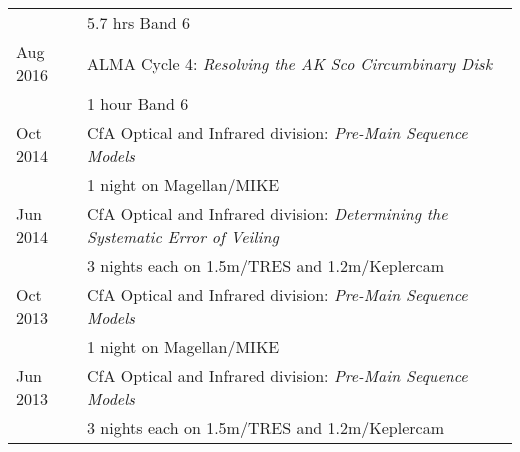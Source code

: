 \begin{tabular*}{\textwidth}{@{\hspace{10pt}}p{1.2in}l}
  & 5.7 hrs Band 6\\
  Aug 2016 & ALMA Cycle 4: \emph{Resolving the AK Sco Circumbinary Disk}\\
  & 1 hour Band 6\\
  Oct 2014 & CfA Optical and Infrared division: \emph{Pre-Main Sequence Models}\\
  & 1 night on Magellan/MIKE\\
  Jun 2014 & CfA Optical and Infrared division: \emph{Determining the Systematic Error of Veiling}\\
  & 3 nights each on 1.5m/TRES and 1.2m/Keplercam\\
  Oct 2013 & CfA Optical and Infrared division: \emph{Pre-Main Sequence Models} \\
  & 1 night on Magellan/MIKE\\
  Jun 2013 & CfA Optical and Infrared division: \emph{Pre-Main Sequence Models}\\
  &  3 nights each on 1.5m/TRES and 1.2m/Keplercam\\
\end{tabular*}
